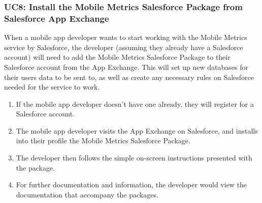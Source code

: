\documentclass[12pt,oneside,letterpaper]{article}
\begin{document}
\subsubsection{\label{Installing the Mobile Metrics Salesforce Package}UC8: Install the Mobile Metrics Salesforce Package from Salesforce App Exchange}
When a mobile app developer wants to start working with the Mobile Metrics service by Salesforce, the developer (assuming they already have a Salesforce account) will need to add the Mobile Metrics Salesforce Package to their Salesforce account from the App Exchange. This will set up new databases for their users data to be sent to, as well as create any necessary rules on Salesforce needed for the service to work.
\begin{enumerate}
\item If the mobile app developer doesn't have one already, they will register for a Salesforce account.
\item The mobile app developer visits the App Exchange on Salesforce, and installs into their profile the Mobile Metrics Salesforce Package.
\item The developer then follows the simple on-screen instructions presented with the package.
\item For further documentation and information, the developer would view the documentation that accompany the packages.
\end{enumerate}







\clearpage
\end{document}

